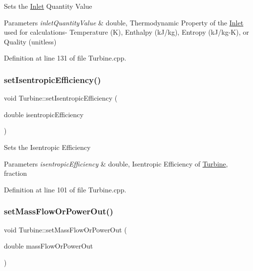 Sets the \hyperlink{class_inlet}{Inlet} Quantity Value


\begin{DoxyParams}{Parameters}
{\em inlet\+Quantity\+Value} & double, Thermodynamic Property of the \hyperlink{class_inlet}{Inlet} used for calculations-\/ Temperature (K), Enthalpy (k\+J/kg), Entropy (k\+J/kg-\/K), or Quality (unitless) \\
\hline
\end{DoxyParams}


Definition at line 131 of file Turbine.\+cpp.

\mbox{\label{class_turbine_ae67daa481ef48bcf8aef84bcccb4611d}} 
\subsubsection{\texorpdfstring{set\+Isentropic\+Efficiency()}{setIsentropicEfficiency()}}
{\footnotesize\ttfamily void Turbine\+::set\+Isentropic\+Efficiency (\begin{DoxyParamCaption}\item[{double}]{isentropic\+Efficiency }\end{DoxyParamCaption})}

Sets the Isentropic Efficiency


\begin{DoxyParams}{Parameters}
{\em isentropic\+Efficiency} & double, Isentropic Efficiency of \hyperlink{class_turbine}{Turbine}, fraction \\
\hline
\end{DoxyParams}


Definition at line 101 of file Turbine.\+cpp.

\mbox{\label{class_turbine_a73522631e2eeefa8ea14d5b537e3e760}} 
\subsubsection{\texorpdfstring{set\+Mass\+Flow\+Or\+Power\+Out()}{setMassFlowOrPowerOut()}}
{\footnotesize\ttfamily void Turbine\+::set\+Mass\+Flow\+Or\+Power\+Out (\begin{DoxyParamCaption}\item[{double}]{mass\+Flow\+Or\+Power\+Out }\end{DoxyParamCaption})}



